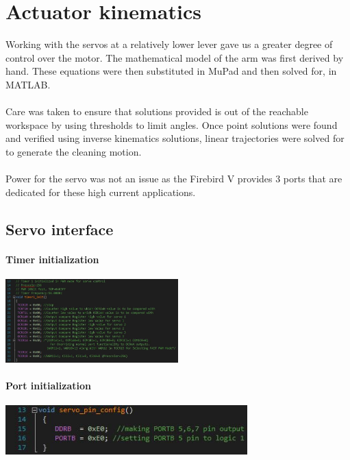 \documentclass[12pt]{article}
\begin{document}
\section{Actuator kinematics}
Working with the servos at a relatively lower lever gave us a greater degree of control over the motor. The mathematical model of the arm was first derived by hand. These equations were then substituted in MuPad and then solved for, in MATLAB.\\ \\
Care was taken to ensure that solutions provided is out of the reachable workspace by using thresholds to limit angles. Once point solutions were found and verified using inverse kinematics solutions, linear trajectories were solved for to generate the cleaning motion.\\ \\
Power for the servo was not an issue as the Firebird V provides 3 ports that are dedicated for these high current applications.\\  

\subsection{Servo interface}

\paragraph{Timer initialization}
\begin{center}
\includegraphics[width=0.5\textwidth]{16.jpg}
\end{center}

\paragraph{Port initialization}
\begin{center}
\includegraphics[width=0.7\textwidth]{17.jpg}
\end{center}
\end{document}
